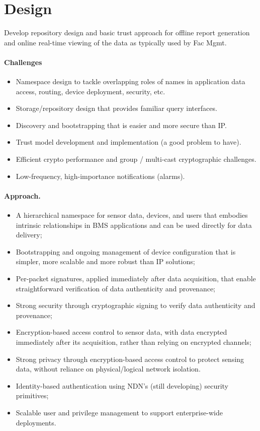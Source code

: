 \section{Design}

Develop repository design and basic trust approach for offline report generation and online real-time viewing of the data as typically used by Fac Mgmt. 

\paragraph{Challenges}
\begin{itemize}
\item Namespace design to tackle overlapping roles of names in application data access, routing, device deployment, security, etc. 
\item Storage/repository design that provides familiar query interfaces.
\item Discovery and bootstrapping that is easier and more secure than IP. 
\item Trust model development and implementation (a good problem to have). 
\item Efficient crypto performance and group / multi-cast cryptographic challenges. 
\item Low-frequency, high-importance notifications (alarms).
\end{itemize}

\paragraph{Approach.}

\begin{itemize}
\item A hierarchical namespace for sensor data, devices, and users that embodies intrinsic relationships in BMS applications and can be used directly for data delivery;
\item Bootstrapping and ongoing management of device configuration that is simpler, more scalable and more robust than IP solutions;
\item Per-packet signatures, applied immediately after data acquisition, that enable  straightforward verification of data authenticity and provenance;
\item Strong security through cryptographic signing to verify data authenticity and provenance;
\item Encryption-based access control to sensor data, with data encrypted immediately after its acquisition, rather than relying on encrypted channels; 
\item Strong privacy through encryption-based access control to protect sensing data, without reliance on physical/logical network isolation.
\item Identity-based authentication using NDN's (still developing) security primitives; 
\item Scalable user and privilege management to support enterprise-wide deployments. 
\end{itemize}




